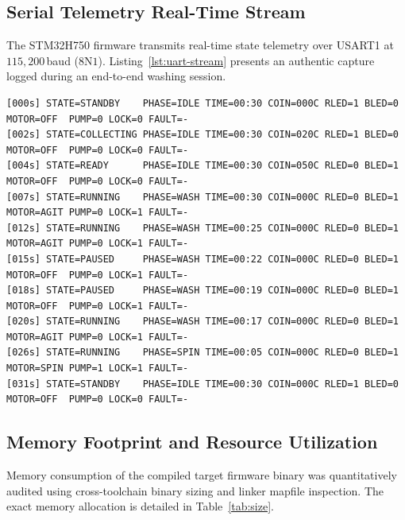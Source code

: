 \subsection{Serial Telemetry Real-Time Stream}

The STM32H750 firmware transmits real-time state telemetry over USART1 at $115{,}200$\,baud ($8\text{N}1$). Listing~\ref{lst:uart-stream} presents an authentic capture logged during an end-to-end washing session.

\begin{lstlisting}[style=logstyle, caption={Real-time UART telemetry stream captured from target hardware}, label={lst:uart-stream}]
[000s] STATE=STANDBY    PHASE=IDLE TIME=00:30 COIN=000C RLED=1 BLED=0 MOTOR=OFF  PUMP=0 LOCK=0 FAULT=-
[002s] STATE=COLLECTING PHASE=IDLE TIME=00:30 COIN=020C RLED=1 BLED=0 MOTOR=OFF  PUMP=0 LOCK=0 FAULT=-
[004s] STATE=READY      PHASE=IDLE TIME=00:30 COIN=050C RLED=0 BLED=1 MOTOR=OFF  PUMP=0 LOCK=0 FAULT=-
[007s] STATE=RUNNING    PHASE=WASH TIME=00:30 COIN=000C RLED=0 BLED=1 MOTOR=AGIT PUMP=0 LOCK=1 FAULT=-
[012s] STATE=RUNNING    PHASE=WASH TIME=00:25 COIN=000C RLED=0 BLED=1 MOTOR=AGIT PUMP=0 LOCK=1 FAULT=-
[015s] STATE=PAUSED     PHASE=WASH TIME=00:22 COIN=000C RLED=0 BLED=1 MOTOR=OFF  PUMP=0 LOCK=1 FAULT=-
[018s] STATE=PAUSED     PHASE=WASH TIME=00:19 COIN=000C RLED=0 BLED=1 MOTOR=OFF  PUMP=0 LOCK=1 FAULT=-
[020s] STATE=RUNNING    PHASE=WASH TIME=00:17 COIN=000C RLED=0 BLED=1 MOTOR=AGIT PUMP=0 LOCK=1 FAULT=-
[026s] STATE=RUNNING    PHASE=SPIN TIME=00:05 COIN=000C RLED=0 BLED=1 MOTOR=SPIN PUMP=1 LOCK=1 FAULT=-
[031s] STATE=STANDBY    PHASE=IDLE TIME=00:30 COIN=000C RLED=1 BLED=0 MOTOR=OFF  PUMP=0 LOCK=0 FAULT=-
\end{lstlisting}

\subsection{Memory Footprint and Resource Utilization}
\label{sec:memory-footprint}

Memory consumption of the compiled target firmware binary was quantitatively audited using cross-toolchain binary sizing and linker mapfile inspection. The exact memory allocation is detailed in Table~\ref{tab:size}.

